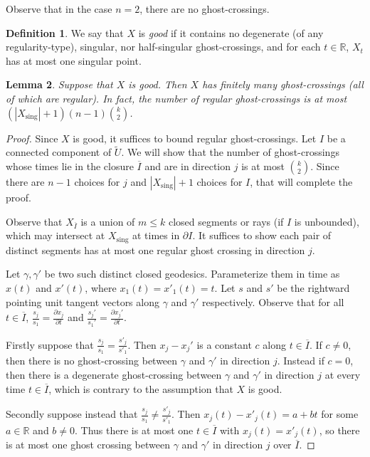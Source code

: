 \documentclass[11pt,reqno,twoside]{amsart}
\newcommand{\sing}{\mathrm{sing}}
\newtheorem{lemma}{Lemma}
\theoremstyle{definition}
\newtheorem{definition}[lemma]{Definition}
\begin{document}
Observe that in the case $n=2$, there are no ghost-crossings.

\begin{definition}
    We say that $X$ is \emph{good} if it contains no degenerate (of any regularity-type), singular, nor half-singular ghost-crossings, and for each $t \in \mathbb{R}$, $X_t$ has at most one singular point.
\end{definition}

\begin{lemma} \label{bound-ghost}
    Suppose that $X$ is \emph{good}. Then $X$ has finitely many ghost-crossings (all of which are regular). In fact, the number of regular ghost-crossings is at most $(|X_{\sing}| + 1)(n-1){k \choose 2}$.
\end{lemma}

\begin{proof}
    Since $X$ is good, it suffices to bound regular ghost-crossings.
    Let $I$ be a connected component of $\tilde U$. We will show that the number of ghost-crossings whose times lie in the closure $\overline I$ and are in direction $j$ is at most ${k \choose 2}$. Since there are $n-1$ choices for $j$ and $|X_\sing| + 1$ choices for $I$, that will complete the proof.

    Observe that $X_{\overline{I}}$ is a union of $m \leq k$ closed segments or rays (if $I$ is unbounded), which may intersect at $X_\sing$ at times in $\partial I$. It suffices to show each pair of distinct segments has at most one regular ghost crossing in direction $j$.

    Let $\gamma,\gamma'$ be two such distinct closed geodesics.  Parameterize them in time as $x(t)$ and $x'(t)$, where $x_1(t) = x'_1(t) = t$. Let $s$ and $s'$ be the rightward pointing unit tangent vectors along $\gamma$ and $\gamma'$ respectively. Observe that for all $t \in \overline{I}$, $\frac{s_j}{s_1} = \frac{\partial x_j}{\partial t}$ and $\frac{s_j'}{s_1'} = \frac{\partial x_j'}{\partial t}.$ 
    
    Firstly suppose that $\frac{s_j}{s_1} = \frac{s'_j}{s'_1}$. Then $x_j-x_j'$ is a constant $c$ along $t \in \overline{I}.$ If $c \neq 0$, then there is no ghost-crossing between $\gamma$ and $\gamma'$ in direction $j$. Instead if $c = 0$, then there is a degenerate ghost-crossing between $\gamma$ and $\gamma'$ in direction $j$ at every time $t \in \overline{I}$,
    which is contrary to the assumption that $X$ is good. 

Secondly suppose instead that $\frac{s_j}{s_1} \neq \frac{s'_j}{s'_1}$. Then $x_j(t) - x'_j(t) = a + bt$ for some $a \in \mathbb{R}$ and $b \neq 0$. Thus there is at most one $t \in \overline{I}$ with $x_j(t) = x'_j(t)$, so there is at most one ghost crossing between $\gamma$ and $\gamma'$ in direction $j$ over $\overline{I}$.
\end{proof}
\end{document}
